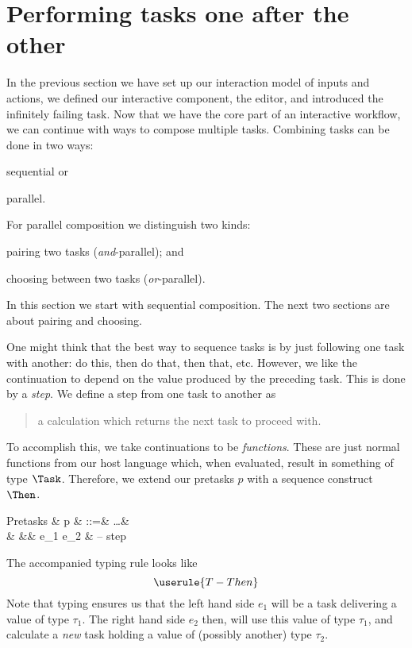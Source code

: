 
\section{Performing tasks one after the other}

In the previous section we have set up our interaction model of inputs and actions,
we defined our interactive component, the editor,
and introduced the infinitely failing task.
Now that we have the core part of an interactive workflow,
we can continue with ways to compose multiple tasks.
Combining tasks can be done in two ways:
\begin{enumerate*}
  \item sequential or
  \item parallel.
\end{enumerate*}
For parallel composition we distinguish two kinds:
\begin{enumerate*}[(a)]
  \item pairing two tasks (\emph{and}-parallel); and
  \item choosing between two tasks (\emph{or}-parallel).
\end{enumerate*}
In this section we start with sequential composition.
The next two sections are about pairing and choosing.

One might think that the best way to sequence tasks is by just following one task with another:
do this, then do that, then that, etc.
However, we like the continuation to depend on the value produced by the preceding task.
This is done by a \emph{step}.
We define a step from one task to another as
\begin{quote}
  a calculation which returns the next task to proceed with.
\end{quote}

To accomplish this,
we take continuations to be \emph{functions}.
These are just normal functions from our host language which,
when evaluated, result in something of type $\Task$.
Therefore,
we extend our pretasks $p$ with a sequence construct $\Then$.
\begin{grammar}
  Pretasks
    & p & ::=& \ldots        & \\
    &   &\mid& e_1 \Then e_2 & – step \\
\end{grammar}

The accompanied typing rule looks like
\begin{equation*}
  \userule{T-Then}
\end{equation*}
Note that typing ensures us that the left hand side $e_1$ will be a task delivering a value of type $\tau_1$.
The right hand side $e_2$ then, will use this value of type $\tau_1$,
and calculate a \emph{new} task holding a value of (possibly another) type $\tau_2$.

